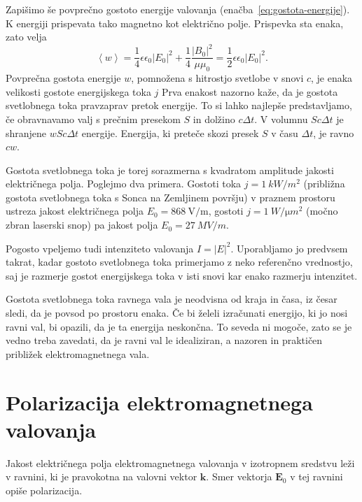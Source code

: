 Zapišimo še povprečno gostoto energije valovanja (enačba~\ref{eq:gostota-energije}). 
K energiji prispevata tako magnetno kot električno polje. Prispevka sta enaka, zato velja
\begin{equation}
\left\langle w\right\rangle =\frac{1}{4}\epsilon\epsilon_{0}\left|E_{0}\right|^{2}+
\frac{1}{4}\frac{\left|B_{0}\right|^{2}}{\mu\mu_{0}}=\frac{1}{2}\epsilon\epsilon_{0}\left|E_{0}\right|^{2}\!.
\end{equation}
Povprečna gostota energije $w$, pomnožena s hitrostjo svetlobe v
snovi $c$, je enaka velikosti gostote energijskega toka $j$
Prva enakost nazorno kaže, da je gostota svetlobnega toka pravzaprav pretok
energije. To si lahko najlepše predstavljamo, če obravnavamo valj s prečnim presekom
$S$ in dolžino $c\Delta t$. V volumnu $Sc\Delta t$ je shranjene $wSc\Delta t$
energije. Energija, ki preteče skozi presek $S$ v času $\Delta t$,
je ravno $cw$. 

Gostota svetlobnega toka je torej sorazmerna
s kvadratom amplitude jakosti električnega polja. Poglejmo dva primera.
Gostoti toka $j=1~\si{kW/m^{2}}$
(približna gostota svetlobnega toka s Sonca na Zemljinem površju) v praznem prostoru ustreza 
jakost električnega polja $E_{0}=868~\si{\volt/\meter}$, gostoti $j=1~\si{W/\micro m^{2}}$ 
(močno zbran laserski snop) pa jakost polja $E_{0}=27~\si{MV/m}$. 

Pogosto vpeljemo tudi intenziteto valovanja $I= |E|^2$. Uporabljamo jo 
predvsem takrat, kadar gostoto svetlobnega toka primerjamo z neko referenčno vrednostjo, 
saj je razmerje gostot energijskega toka v isti snovi kar enako razmerju intenzitet.

Gostota svetlobnega toka ravnega vala je neodvisna od kraja in časa, iz česar sledi,
da je povsod po prostoru enaka. Če bi želeli izračunati energijo,
ki jo nosi ravni val, bi opazili, da je ta energija neskončna. To
seveda ni mogoče, zato se je vedno treba zavedati, da je ravni val
le idealiziran, a nazoren in praktičen približek elektromagnetnega
vala.

\section{Polarizacija elektromagnetnega valovanja}
Jakost električnega polja elektromagnetnega valovanja v izotropnem
sredstvu leži v ravnini, ki je pravokotna na valovni vektor $\mathbf{k}$. 
Smer vektorja $\mathbf{E}_0$ v tej ravnini opiše
polarizacija. 

